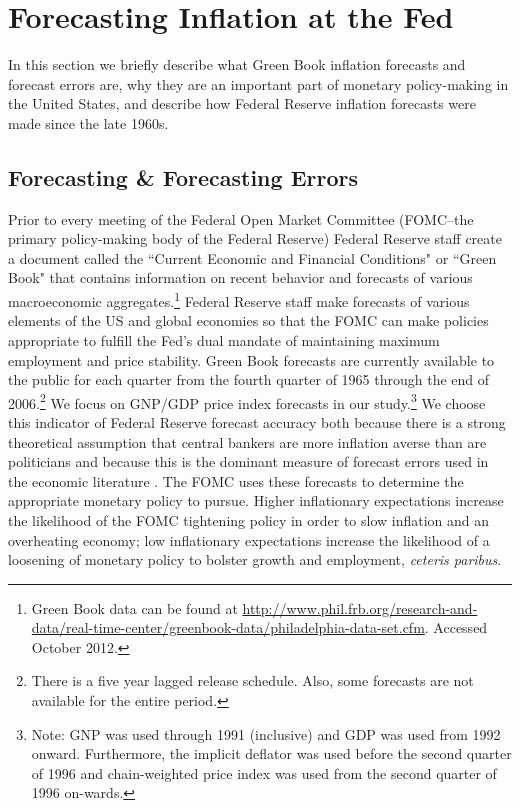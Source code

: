 \documentclass[a4paper]{article}
\begin{document}

\section{Forecasting Inflation at the Fed}

In this section we briefly describe what Green Book inflation forecasts and forecast errors are, why they are an important part of monetary policy-making in the United States, and describe how Federal Reserve inflation forecasts were made since the late 1960s.

\subsection{Forecasting \& Forecasting Errors}

Prior to every meeting of the Federal Open Market Committee (FOMC--the primary policy-making body of the Federal Reserve) Federal Reserve staff create a document called the ``Current Economic and Financial Conditions" or ``Green Book" that contains information on recent behavior and forecasts of various macroeconomic aggregates.\footnote{Green Book data can be found at {\url{http://www.phil.frb.org/research-and-data/real-time-center/greenbook-data/philadelphia-data-set.cfm}}. Accessed October 2012.} Federal Reserve staff make forecasts of various elements of the US and global economies so that the FOMC can make policies appropriate to fulfill the Fed's dual mandate of maintaining maximum employment and price stability. Green Book forecasts are currently available to the public for each quarter from the fourth quarter of 1965 through the end of 2006.\footnote{There is a five year lagged release schedule. Also, some forecasts are not available for the entire period.}  We focus on GNP/GDP price index forecasts in our study.\footnote{Note: GNP was used through 1991 (inclusive) and GDP was used from 1992 onward. Furthermore, the implicit deflator was used before the second quarter of 1996 and chain-weighted price index was used from the second quarter of 1996 on-wards.} We choose this indicator of Federal Reserve forecast accuracy both because there is a strong theoretical assumption that central bankers are more inflation averse than are politicians \citep{Cukierman1992,Mukherjee2008,Tillmann2008} and because this is the dominant measure of forecast errors used in the economic literature \citep[c.f.][]{Romer2000}. The FOMC uses these forecasts to determine the appropriate monetary policy to pursue. Higher inflationary expectations increase the likelihood of the FOMC tightening policy in order to slow inflation and an overheating economy; low inflationary expectations increase the likelihood of a loosening of monetary policy to bolster growth and employment, \emph{ceteris paribus}.
\end{document}
